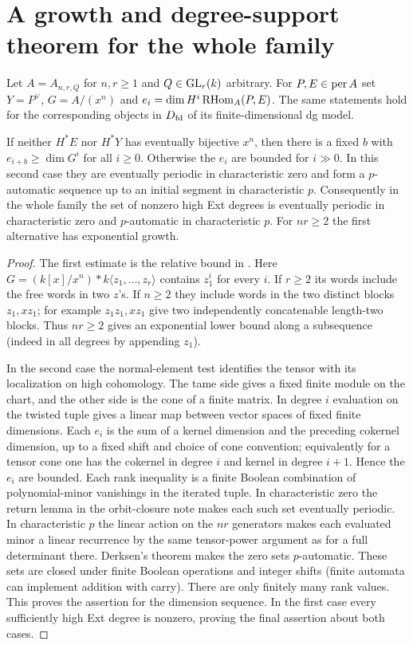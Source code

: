 \documentclass[11pt]{article}
\begin{document}
\section{A growth and degree-support theorem for the whole family}
Let $A=A_{n,r,Q}$ for $n,r\ge1$ and $Q\in{\rm GL}_r(k)$ arbitrary.
For $P,E\in\operatorname{per} A$ set $Y=P^\vee$, $G=A/(x^n)$ and
$e_i=\dim H^i\operatorname{RHom}_A(P,E)$. The same statements hold for the corresponding
objects in $D_{\mathrm{fd}}$ of its finite-dimensional dg model.
\begin{thm}\label{dichotomy}
If neither $H^*E$ nor $H^*Y$ has eventually bijective $x^n$, then
there is a fixed $b$ with $e_{i+b}\ge\dim G^i$ for all $i\ge0$.
Otherwise the $e_i$ are bounded for $i\gg0$.
In this second case they are eventually periodic in characteristic
zero and form a $p$-automatic sequence up to an initial segment in
characteristic $p$. Consequently in the whole family the set of
nonzero high Ext degrees is eventually periodic in characteristic
zero and $p$-automatic in characteristic $p$. For $nr\ge2$ the
first alternative has exponential growth.
\end{thm}
\begin{proof}
The first estimate is the relative bound in . Here $G=(k[x]/x^n)*
k\langle z_1,\ldots,z_r\rangle$ contains $z_1^i$ for every $i$.
If $r\ge2$ its words include the free words in two $z$'s. If $n\ge2$
they include words in the two distinct blocks $z_1,xz_1$; for example
$z_1z_1,xz_1$ give two independently concatenable length-two blocks.
Thus $nr\ge2$ gives an exponential lower bound along a subsequence
(indeed in all degrees by appending $z_1$).

In the second case the normal-element test identifies the tensor with
its localization on high cohomology. The tame side gives a fixed finite
module on the chart, and the other side is the cone of a finite matrix.
In degree $i$ evaluation on the twisted tuple gives a linear map
between vector spaces of fixed finite dimensions. Each $e_i$ is the
sum of a kernel dimension and the preceding cokernel dimension,
up to a fixed shift and choice of cone convention; equivalently for
a tensor cone one has the cokernel in degree $i$ and kernel in degree
$i+1$. Hence the $e_i$ are bounded. Each rank inequality is a finite
Boolean combination of polynomial-minor vanishings in the iterated
tuple. In characteristic zero the return lemma in the orbit-closure
note makes each such set eventually periodic. In characteristic $p$
the linear action on the $nr$ generators makes each evaluated minor
a linear recurrence by the same tensor-power argument as for a full
determinant there. Derksen's theorem makes the zero sets $p$-automatic.
These sets are closed under finite Boolean operations and integer
shifts (finite automata can implement addition with carry). There are
only finitely many rank values. This proves the assertion for the
dimension sequence. In the first case every sufficiently high Ext
degree is nonzero, proving the final assertion about both cases.
\end{proof}
\end{document}
